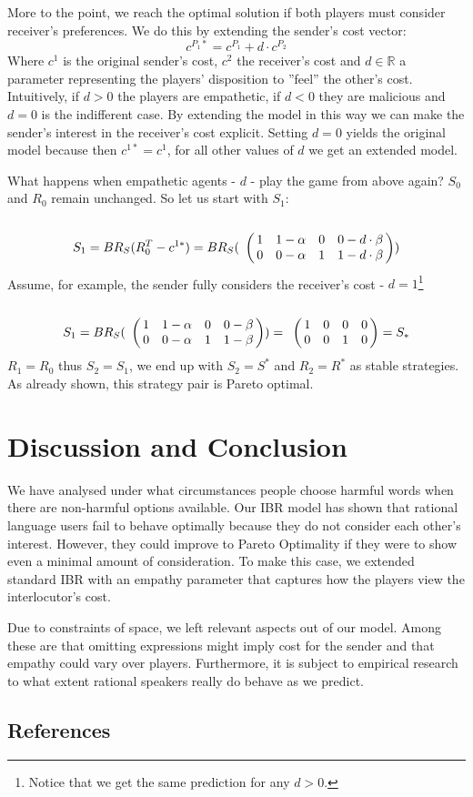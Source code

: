 \documentclass[10pt,a4paper]{article}
\begin{document}
More to the point, we reach the optimal solution if both players must consider receiver's preferences. We do this by extending the sender's cost vector:
$$c^{P_1*}=c^{P_1} + d \cdot c^{P_2}$$
Where $c^{1}$ is the original sender's cost, $c^{2}$ the receiver's cost and $d \in \mathbb{R}$ a parameter representing the players' disposition to ''feel'' the other's cost. Intuitively, if $d>0$ the players are empathetic, if $d<0$ they are malicious and $d=0$ is the indifferent case. By extending the model in this way we can make the sender's interest in the receiver's cost explicit. Setting $d=0$ yields the original model because then $c^{1*}=c^{1}$, for all other values of $d$ we get an extended model.

What happens when empathetic agents - $d$ - play the game from above again? $S_0$ and $R_0$ remain unchanged. So let us start with $S_1$:
\begin{equation*}
S_1= BR_S(R_0^T-c^{1*})=BR_S(
\bordermatrix{
                & & & &    \cr
     &       1 &         1-\alpha & 0       & 0-d\cdot \beta \cr
     &       0 &         0-\alpha & 1      & 1-d\cdot \beta
 }
)
\end{equation*}
Assume, for example, the sender fully considers the receiver's cost - $d=1$\footnote{Notice that we get the same prediction for any $d>0$.}
\begin{equation*}
S_1=BR_S(
\bordermatrix{
                & & & &    \cr
     &       1 &         1-\alpha & 0       & 0-\beta \cr
     &       0 &         0-\alpha & 1      & 1-\beta
 }
 )
=
\bordermatrix{
                & & & &    \cr
     &       1 &         0 & 0       & 0 \cr
     &       0 &         0 & 1      & 0
 }
 =S_*
 \end{equation*}
$R_1=R_0$ thus $S_2=S_1$, we end up with $S_2=S^*$ and $R_2=R^*$ as stable strategies.
As already shown, this strategy pair is Pareto optimal.
\section{Discussion and Conclusion}
We have analysed under what circumstances people choose harmful words when there are non-harmful options available.
Our IBR model has shown that rational language users fail to behave optimally because they do not consider each other's interest. However, they could improve to Pareto Optimality if they were to show even a minimal amount of consideration. To make this case, we extended standard IBR with an empathy parameter that captures how the players view the interlocutor's cost.

Due to constraints of space, we left relevant aspects out of our model. Among these are that omitting expressions might imply cost for the sender and that empathy could vary over players. Furthermore, it is subject to empirical research to what extent rational speakers really do behave as we predict.

\subsection{References}


\end{document}
